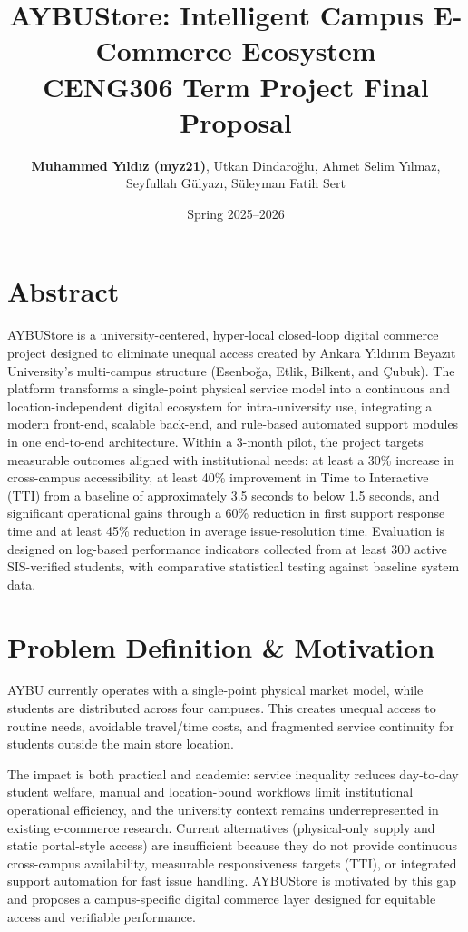 \documentclass[11pt,a4paper]{article}
\title{\LARGE \textbf{AYBUStore: Intelligent Campus E-Commerce Ecosystem}\\[0.5em] \large \textbf{CENG306 Term Project Final Proposal}}
\author{\textbf{Muhammed Yıldız (myz21)}, Utkan Dindaroğlu, Ahmet Selim Yılmaz, \\ Seyfullah Gülyazı, Süleyman Fatih Sert}
\date{Spring 2025--2026}
\begin{document}
 
\maketitle
 
\section{Abstract}
AYBUStore is a university-centered, hyper-local closed-loop digital commerce project designed to eliminate unequal access created by Ankara Yıldırım Beyazıt University's multi-campus structure (Esenboğa, Etlik, Bilkent, and Çubuk). The platform transforms a single-point physical service model into a continuous and location-independent digital ecosystem for intra-university use, integrating a modern front-end, scalable back-end, and rule-based automated support modules in one end-to-end architecture. Within a 3-month pilot, the project targets measurable outcomes aligned with institutional needs: at least a 30\% increase in cross-campus accessibility, at least 40\% improvement in Time to Interactive (TTI) from a baseline of approximately 3.5 seconds to below 1.5 seconds, and significant operational gains through a 60\% reduction in first support response time and at least 45\% reduction in average issue-resolution time. Evaluation is designed on log-based performance indicators collected from at least 300 active SIS-verified students, with comparative statistical testing against baseline system data.
 
\section{Problem Definition \& Motivation}
AYBU currently operates with a single-point physical market model, while students are distributed across four campuses. This creates unequal access to routine needs, avoidable travel/time costs, and fragmented service continuity for students outside the main store location.
 
The impact is both practical and academic: service inequality reduces day-to-day student welfare, manual and location-bound workflows limit institutional operational efficiency, and the university context remains underrepresented in existing e-commerce research. Current alternatives (physical-only supply and static portal-style access) are insufficient because they do not provide continuous cross-campus availability, measurable responsiveness targets (TTI), or integrated support automation for fast issue handling. AYBUStore is motivated by this gap and proposes a campus-specific digital commerce layer designed for equitable access and verifiable performance.
 
\end{document}
